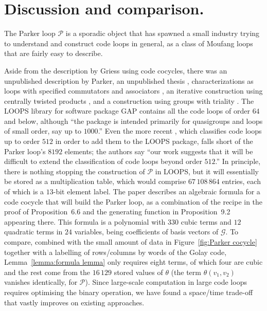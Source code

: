 \documentclass{article}
\theoremstyle{plain}
\theoremstyle{definition}
\def \cG {\mathcal{G}}
\def \cP {\mathcal{P}}
\begin{document}
\section{Discussion and comparison.}\label{sec:discussion}

The Parker loop $\cP$ is a sporadic object that has spawned a small industry trying to understand and construct code loops in general, as a class of Moufang loops that are fairly easy to describe.

Aside from the description by Griess using code cocycles, there was an unpublished description by Parker, an unpublished thesis \cite{Johnson}, characterizations as loops with specified commutators and associators \cite{CheinGoodaire}, an iterative construction using centrally twisted products \cite{Hsu}, and a construction using groups with triality \cite{Nagy}. 
The LOOPS library \cite{LOOPS} for software package GAP \cite{GAP4} contains all the code loops of order $64$ and below, although ``the package is intended primarily for quasigroups and loops of small order, say up to $1000$.''
Even the more recent \cite{OBrien_Vojtechovsky}, which classifies code loops up to order $512$ in order to add them to the LOOPS package, falls short of the Parker loop's $8192$ elements; the authors say ``our work suggests that it will be difficult to extend the classification of code loops beyond order $512$.''
In principle, there is nothing stopping the construction of $\cP$ in LOOPS, but it will essentially be stored as a multiplication table, which would comprise $67\,108\,864$ entries, each of which is a $13$-bit element label.
The paper \cite{Morier-Genoud_Ovsienko} describes an algebraic formula for a code cocycle that will build the Parker loop, as a combination of the recipe in the proof of Proposition~6.6 and the generating function in Proposition~9.2 appearing there.
This formula is a polynomial with $330$ cubic terms and $12$ quadratic terms in $24$ variables, being coefficients of basis vectors of $\cG$. 
To compare, combined with the small amount of data in Figure~\ref{fig:Parker cocycle} together with a labelling of rows/columns by words of the Golay code, Lemma~\ref{lemma:formula lemma} only requires eight terms, of which four are cubic and the rest come from the $16\,129$ stored values of $\theta$ (the term $\theta(v_1,v_2)$ vanishes identically, for $\cP$).
Since large-scale computation in large code loops requires optimising the binary operation, we have found a space/time trade-off that vastly improves on existing approaches.
\end{document}
